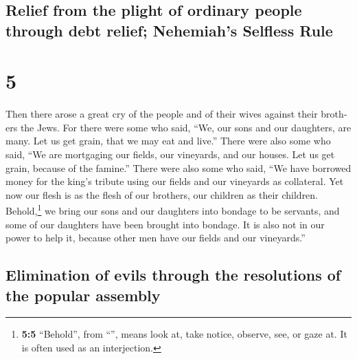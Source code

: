 \begin{paracol}{2}
\switchcolumn
\begin{otherlanguage}{english}

\hypertarget{relief-from-the-plight-of-ordinary-people-through-debt-relief-nehemiahs-selfless-rule}{%
\subsection{Relief from the plight of ordinary people through debt
relief; Nehemiah's Selfless
Rule}\label{relief-from-the-plight-of-ordinary-people-through-debt-relief-nehemiahs-selfless-rule}}

\hypertarget{section-9}{%
\section{5}\label{section-9}}

 Then there arose a great cry of the people and of their
wives against their brothers the Jews.  For there were
some who said, ``We, our sons and our daughters, are many. Let us get
grain, that we may eat and live.''  There were also some
who said, ``We are mortgaging our fields, our vineyards, and our houses.
Let us get grain, because of the famine.''  There were
also some who said, ``We have borrowed money for the king's tribute
using our fields and our vineyards as collateral.  Yet now
our flesh is as the flesh of our brothers, our children as their
children. Behold,\footnote{\textbf{5:5} ``Behold'', from
  ``'', means look at, take notice, observe, see, or gaze
  at. It is often used as an interjection.} we bring our sons and our
daughters into bondage to be servants, and some of our daughters have
been brought into bondage. It is also not in our power to help it,
because other men have our fields and our vineyards.''

\hypertarget{elimination-of-evils-through-the-resolutions-of-the-popular-assembly}{%
\subsection{Elimination of evils through the resolutions of the popular
assembly}\label{elimination-of-evils-through-the-resolutions-of-the-popular-assembly}}


\end{otherlanguage}
\end{paracol}
